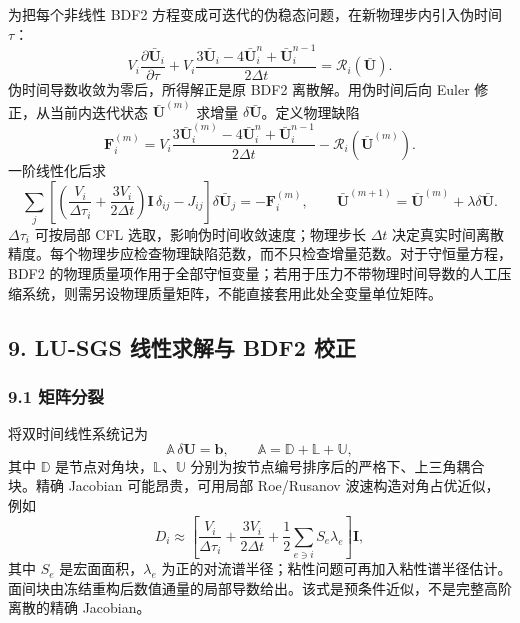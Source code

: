 \documentclass[
  12pt,
  UTF8]{ctexart}
\begin{document}
为把每个非线性 BDF2 方程变成可迭代的伪稳态问题，在新物理步内引入伪时间
\(\tau\)： \begin{equation}
V_i\frac{\partial\bar{\boldsymbol U}_i}{\partial\tau}
+V_i\frac{3\bar{\boldsymbol U}_i-4\bar{\boldsymbol U}_i^n+
\bar{\boldsymbol U}_i^{n-1}}{2\Delta t}
=\boldsymbol{\mathcal R}_i(\bar{\boldsymbol U}).\end{equation} 伪时间导数收敛为零后，所得解正是原 BDF2 离散解。用伪时间后向 Euler
修正，从当前内迭代状态 \(\bar{\boldsymbol U}^{(m)}\) 求增量
\(\delta\bar{\boldsymbol U}\)。定义物理缺陷 \begin{equation}
\boldsymbol F_i^{(m)}=
V_i\frac{3\bar{\boldsymbol U}_i^{(m)}-4\bar{\boldsymbol U}_i^n+
\bar{\boldsymbol U}_i^{n-1}}{2\Delta t}
-\boldsymbol{\mathcal R}_i(\bar{\boldsymbol U}^{(m)}).\end{equation} 一阶线性化后求 \begin{equation}
\boxed{
\sum_j\left[
\left(\frac{V_i}{\Delta\tau_i}+\frac{3V_i}{2\Delta t}\right)
\boldsymbol I\,\delta_{ij}-J_{ij}
\right]\delta\bar{\boldsymbol U}_j=-\boldsymbol F_i^{(m)},\qquad
\bar{\boldsymbol U}^{(m+1)}=
\bar{\boldsymbol U}^{(m)}+\lambda\delta\bar{\boldsymbol U}.}\end{equation} \(\Delta\tau_i\) 可按局部 CFL 选取，影响伪时间收敛速度；物理步长
\(\Delta t\)
决定真实时间离散精度。每个物理步应检查物理缺陷范数，而不只检查增量范数。对于守恒量方程，BDF2
的物理质量项作用于全部守恒变量；若用于压力不带物理时间导数的人工压缩系统，则需另设物理质量矩阵，不能直接套用此处全变量单位矩阵。

\hypertarget{lu-sgs-ux7ebfux6027ux6c42ux89e3ux4e0e-bdf2-ux6821ux6b63}{%
\subsection{9. LU-SGS 线性求解与 BDF2
校正}\label{lu-sgs-ux7ebfux6027ux6c42ux89e3ux4e0e-bdf2-ux6821ux6b63}}

\hypertarget{ux77e9ux9635ux5206ux88c2}{%
\subsubsection{9.1 矩阵分裂}\label{ux77e9ux9635ux5206ux88c2}}

将双时间线性系统记为 \begin{equation}
\mathbb A\,\delta\boldsymbol U=\boldsymbol b,
\qquad \mathbb A=\mathbb D+\mathbb L+\mathbb U,\end{equation} 其中 \(\mathbb D\) 是节点对角块，\(\mathbb L\)、\(\mathbb U\)
分别为按节点编号排序后的严格下、上三角耦合块。精确 Jacobian
可能昂贵，可用局部 Roe/Rusanov 波速构造对角占优近似，例如 \begin{equation}
D_i\approx
\left[\frac{V_i}{\Delta\tau_i}+\frac{3V_i}{2\Delta t}
+\frac12\sum_{e\ni i}S_e\lambda_e\right]\boldsymbol I,\end{equation} 其中 \(S_e\) 是宏面面积，\(\lambda_e\)
为正的对流谱半径；粘性问题可再加入粘性谱半径估计。面间块由冻结重构后数值通量的局部导数给出。该式是预条件近似，不是完整高阶离散的精确
Jacobian。
\end{document}
